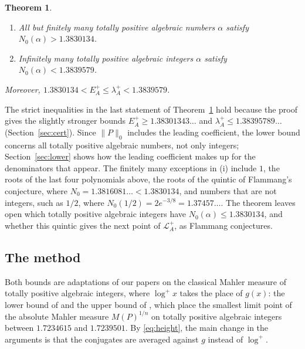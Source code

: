 \documentclass[11pt]{amsart}
\newtheorem{theorem}{Theorem}[section]
\theoremstyle{remark}
\numberwithin{equation}{section}
\newcommand{\logp}{\log^{+}}
\newcommand{\LB}{1.3830134}
\newcommand{\UB}{1.3839579}
\newcommand{\FlamNext}{1.3816081}
\begin{document}
\begin{theorem}\label{thm:main}
\begin{enumerate}[label=\textup{(\roman*)}]
\item All but finitely many totally positive algebraic numbers $\alpha$ satisfy $N_0(\alpha)>\LB$.
\item Infinitely many totally positive algebraic integers $\alpha$ satisfy $N_0(\alpha)<\UB$.
\end{enumerate}
Moreover, $\LB<E_A^+\le\lambda_A^+<\UB$.
\end{theorem}

The strict inequalities in the last statement of Theorem~\ref{thm:main} hold because the proof gives the slightly stronger bounds $E_A^+\ge1.38301343\ldots$ and $\lambda_A^+\le1.38395789\ldots$ (Section~\ref{sec:cert}). Since $\|P\|_0$ includes the leading coefficient, the lower bound concerns all totally positive algebraic numbers, not only integers; Section~\ref{sec:lower} shows how the leading coefficient makes up for the denominators that appear. The finitely many exceptions in (i) include $1$, the roots of the last four polynomials above, the roots of the quintic of Flammang's conjecture, where $N_0=\FlamNext\ldots<\LB$, and numbers that are not integers, such as $1/2$, where $N_0(1/2)=2e^{-3/8}=1.37457\ldots$. The theorem leaves open which totally positive algebraic integers have $N_0(\alpha)\le\LB$, and whether this quintic gives the next point of $\mathcal L_A^+$, as Flammang conjectures.

\subsection*{The method}
Both bounds are adaptations of our papers on the classical Mahler measure of totally positive algebraic integers, where $\logp x$ takes the place of $g(x)$: the lower bound of \cite{Tom26a} and the upper bound of \cite{Tom26b}, which place the smallest limit point of the absolute Mahler measure $M(P)^{1/n}$ on totally positive algebraic integers between $1.7234615$ and $1.7239501$. By \eqref{eq:height}, the main change in the arguments is that the conjugates are averaged against $g$ instead of $\logp$.
\end{document}
